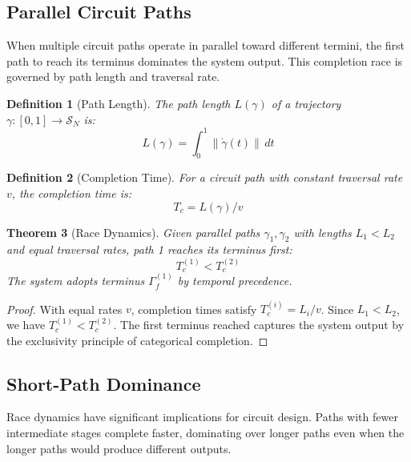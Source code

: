 \documentclass[aps,prl,twocolumn,superscriptaddress,showpacs]{revtex4-2}
\newtheorem{theorem}{Theorem}[section]
\newtheorem{definition}[theorem]{Definition}
\newcommand{\Sspace}{\mathcal{S}}
\newcommand{\traj}{\gamma}
\newcommand{\term}{\Gamma}
\begin{document}
\subsection{Parallel Circuit Paths}

When multiple circuit paths operate in parallel toward different termini, the first path to reach its terminus dominates the system output. This completion race is governed by path length and traversal rate.

\begin{definition}[Path Length]
The path length $L(\traj)$ of a trajectory $\traj: [0,1] \to \Sspace_N$ is:
\begin{equation}
L(\traj) = \int_0^1 \|\dot{\traj}(t)\| \, dt
\end{equation}
\end{definition}

\begin{definition}[Completion Time]
For a circuit path with constant traversal rate $v$, the completion time is:
\begin{equation}
T_c = L(\traj) / v
\end{equation}
\end{definition}

\begin{theorem}[Race Dynamics]
\label{thm:race}
Given parallel paths $\traj_1, \traj_2$ with lengths $L_1 < L_2$ and equal traversal rates, path 1 reaches its terminus first:
\begin{equation}
T_c^{(1)} < T_c^{(2)}
\end{equation}
The system adopts terminus $\term_f^{(1)}$ by temporal precedence.
\end{theorem}

\begin{proof}
With equal rates $v$, completion times satisfy $T_c^{(i)} = L_i / v$. Since $L_1 < L_2$, we have $T_c^{(1)} < T_c^{(2)}$. The first terminus reached captures the system output by the exclusivity principle of categorical completion.
\end{proof}

\subsection{Short-Path Dominance}

Race dynamics have significant implications for circuit design. Paths with fewer intermediate stages complete faster, dominating over longer paths even when the longer paths would produce different outputs.
\end{document}
